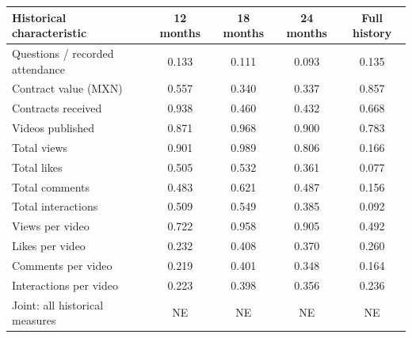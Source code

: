 \begingroup\small
\setlength{\tabcolsep}{3pt}
\renewcommand{\arraystretch}{1.25}
\noindent%
\begin{tabular*}{\linewidth}{@{\extracolsep{\fill}}lcccc@{}}
\toprule
Historical characteristic & 12 months & 18 months & 24 months & Full history \\
\midrule
Questions / recorded attendance & 0.133 & 0.111 & 0.093 & 0.135 \\
\addlinespace
Contract value (MXN) & 0.557 & 0.340 & 0.337 & 0.857 \\
Contracts received & 0.938 & 0.460 & 0.432 & 0.668 \\
\addlinespace
Videos published & 0.871 & 0.968 & 0.900 & 0.783 \\
Total views & 0.901 & 0.989 & 0.806 & 0.166 \\
Total likes & 0.505 & 0.532 & 0.361 & 0.077 \\
Total comments & 0.483 & 0.621 & 0.487 & 0.156 \\
Total interactions & 0.509 & 0.549 & 0.385 & 0.092 \\
Views per video & 0.722 & 0.958 & 0.905 & 0.492 \\
Likes per video & 0.232 & 0.408 & 0.370 & 0.260 \\
Comments per video & 0.219 & 0.401 & 0.348 & 0.164 \\
Interactions per video & 0.223 & 0.398 & 0.356 & 0.236 \\
\midrule
Joint: all historical measures & NE & NE & NE & NE \\
\bottomrule
\end{tabular*}\par\endgroup
